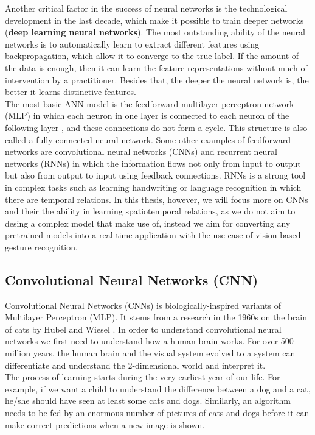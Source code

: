 Another critical factor in the success of neural networks is the technological development in the last decade, which  make it possible to train deeper networks (\textbf{deep learning neural networks}). The most outstanding ability of the neural networks is to automatically learn to extract different features using backpropagation, which allow it to converge to the true label.  If the amount of the data is enough, then it can learn the feature representations without much of intervention by a practitioner. Besides that,  the deeper the neural network is, the better it learns distinctive features.\\ 

The most basic ANN model is the feedforward multilayer perceptron network (MLP) in which each neuron in one layer is connected to each neuron of the following layer \cite{goodfellow_deep_2016}, and these connections do not form a cycle.  This structure is also called a fully-connected neural network. Some other examples of feedforward networks are convolutional neural networks (CNNs) and  recurrent neural networks (RNNs) in which the information flows not only from input to output but also from output to input using feedback connections.  RNNs is a strong tool in complex tasks such as learning handwriting or language recognition in which there are temporal relations.  In this thesis, however, we will focus more on CNNs and their the ability in learning spatiotemporal relations, as we do not aim to desing a complex model that make use of, instead we aim for converting  any pretrained models into a real-time application with the use-case of vision-based gesture recognition.\\

\subsection{Convolutional Neural Networks (CNN)}
\label{subsec:cnn}
Convolutional  Neural Networks (CNNs) is biologically-inspired variants of Multilayer Perceptron (MLP).  It stems from a research in the 1960s on the brain of cats by Hubel and Wiesel \cite{hubel_receptive_1968}.  In order to understand convolutional neural networks we first need to understand how a human brain works.  For over 500 million years, the human brain and the visual system evolved to a system can differentiate and understand the 2-dimensional world and interpret it.\\

The process of learning starts during the very earliest year of our life.  For example, if we want a child to understand the difference between a dog and a cat,  he/she should have seen at least some cats and dogs.  Similarly, an algorithm needs to be fed by an enormous number of pictures of cats and dogs before it can make correct predictions when a new image is shown. \\

